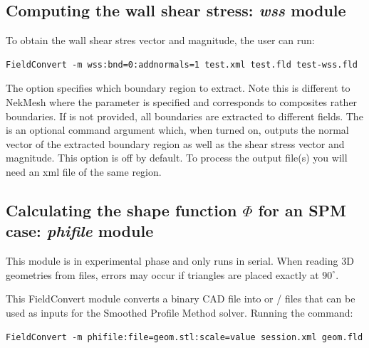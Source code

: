 \subsection{Computing the wall shear stress: \textit{wss} module}
To obtain the wall shear stres vector and magnitude, the user can run:
\begin{lstlisting}[style=BashInputStyle]
FieldConvert -m wss:bnd=0:addnormals=1 test.xml test.fld test-wss.fld
\end{lstlisting}
The option  specifies which boundary region to extract. Note this is
different to NekMesh where the parameter  is specified and corresponds
to composites rather boundaries. If  is not provided, all boundaries
are extracted to different fields. The  is an optional command
argument which, when turned on, outputs the normal vector of the extracted boundary
region as well as the shear stress vector and magnitude. This option is off by default.
To process the output file(s) you will need an xml file of the same region.
%
%
%

\subsection{Calculating the shape function $\Phi$ for an SPM case:
\textit{phifile} module}
\label{s:utilities:fieldconvert:sub:phifile}

\begin{notebox}
    This module is in experimental phase and only runs in serial. When reading
    3D geometries from  files, errors may occur if triangles are
    placed exactly at $90^{\circ}$.
\end{notebox}

This FieldConvert module converts a binary  CAD file into
 or / files that can be used as inputs for
the Smoothed Profile Method solver. Running the command:

\begin{lstlisting}[style=BashInputStyle]
    FieldConvert -m phifile:file=geom.stl:scale=value session.xml geom.fld
\end{lstlisting}

